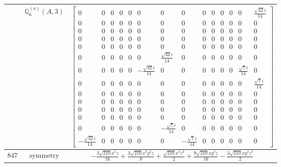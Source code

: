 \documentclass[fleqn,8pt,landscape]{jsarticle}
\begin{document}
\begin{longtable}{ccc}
$  $ & $ \mathbb{Q}_{6}^{(a)}(A,3) $ & $ \begin{bmatrix} 0 & 0 & 0 & 0 & 0 & 0 & 0 & 0 & 0 & 0 & 0 & 0 & 0 & \frac{\sqrt{42} i}{14} \\ 0 & 0 & 0 & 0 & 0 & 0 & 0 & 0 & 0 & 0 & 0 & 0 & 0 & 0 \\ 0 & 0 & 0 & 0 & 0 & 0 & 0 & 0 & 0 & 0 & 0 & 0 & 0 & 0 \\ 0 & 0 & 0 & 0 & 0 & 0 & 0 & 0 & 0 & 0 & 0 & 0 & 0 & 0 \\ 0 & 0 & 0 & 0 & 0 & 0 & 0 & 0 & 0 & 0 & 0 & 0 & 0 & 0 \\ 0 & 0 & 0 & 0 & 0 & 0 & \frac{\sqrt{42} i}{14} & 0 & 0 & 0 & 0 & 0 & 0 & 0 \\ 0 & 0 & 0 & 0 & 0 & - \frac{\sqrt{42} i}{14} & 0 & 0 & 0 & 0 & 0 & 0 & \frac{\sqrt{7} i}{14} & 0 \\ 0 & 0 & 0 & 0 & 0 & 0 & 0 & 0 & 0 & 0 & 0 & 0 & 0 & \frac{\sqrt{7} i}{14} \\ 0 & 0 & 0 & 0 & 0 & 0 & 0 & 0 & 0 & 0 & 0 & 0 & 0 & 0 \\ 0 & 0 & 0 & 0 & 0 & 0 & 0 & 0 & 0 & 0 & 0 & 0 & 0 & 0 \\ 0 & 0 & 0 & 0 & 0 & 0 & 0 & 0 & 0 & 0 & 0 & 0 & 0 & 0 \\ 0 & 0 & 0 & 0 & 0 & 0 & 0 & 0 & 0 & 0 & 0 & 0 & 0 & 0 \\ 0 & 0 & 0 & 0 & 0 & 0 & - \frac{\sqrt{7} i}{14} & 0 & 0 & 0 & 0 & 0 & 0 & 0 \\ - \frac{\sqrt{42} i}{14} & 0 & 0 & 0 & 0 & 0 & 0 & - \frac{\sqrt{7} i}{14} & 0 & 0 & 0 & 0 & 0 & 0 \end{bmatrix} $ \\ \hline
$ 847 $ & $ \text{symmetry} $ & $ - \frac{3 \sqrt{210} x^{5} z}{16} + \frac{3 \sqrt{210} x^{3} y^{2} z}{8} + \frac{\sqrt{210} x^{3} z^{3}}{2} + \frac{9 \sqrt{210} x y^{4} z}{16} - \frac{3 \sqrt{210} x y^{2} z^{3}}{2} $ \\

\end{longtable}
\end{document}
